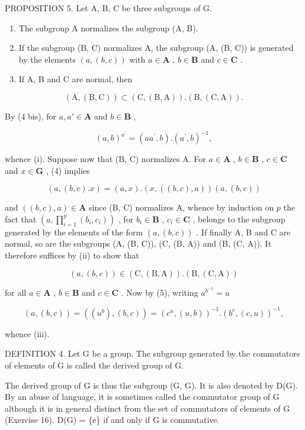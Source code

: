 PROPOSITION 5. Let A, B, C be three subgroups of G.

\begin{enumerate}
\def\labelenumi{(\roman{enumi})}
\item
  The subgroup A normalizes the subgroup (A, B).
\item
  If the subgroup (B, C) normalizes A, the subgroup (A, (B, C)) is generated by the elements \((a, (b, c))\) with \(a \in \mathbf{A}\) , \(b \in \mathbf{B}\) and \(c \in \mathbf{C}\) .
\item
  If A, B and C are normal, then
\end{enumerate}

\[
(\mathrm{A}, (\mathrm{B}, \mathrm{C})) \subset (\mathrm{C}, (\mathrm{B}, \mathrm{A})). (\mathrm{B}, (\mathrm{C}, \mathrm{A})).
\]

By (4 bis), for \(a, a' \in \mathbf{A}\) and \(b \in \mathbf{B}\) ,

\[
(a, b) ^ {a ^ {\prime}} = (a a ^ {\prime}, b). (a ^ {\prime}, b) ^ {- 1},
\]

whence (i). Suppose now that (B, C) normalizes A. For \(a \in \mathbf{A}\) , \(b \in \mathbf{B}\) , \(c \in \mathbf{C}\) and \(x \in \mathbf{G}\) , (4) implies

\[
(a, (b, c). x) = (a, x). (x, ((b, c), a)) (a, (b, c))
\]

and \(((b, c), a) \in \mathbf{A}\) since (B, C) normalizes A, whence by induction on \(p\) the fact that \(\left(a, \prod_{i=1}^{p} (b_i, c_i)\right)\) , for \(b_i \in \mathbf{B}\) , \(c_i \in \mathbf{C}\) , belongs to the subgroup generated by the elements of the form \((a, (b, c))\) . If finally A, B and C are normal, so are the subgroups (A, (B, C)), (C, (B, A)) and (B, (C, A)). It therefore suffices by (ii) to show that

\[
(a, (b, c)) \in (\mathrm{C}, (\mathrm{B}, \mathrm{A})). (\mathrm{B}, (\mathrm{C}, \mathrm{A}))
\]

for all \(a \in \mathbf{A}\) , \(b \in \mathbf{B}\) and \(c \in \mathbf{C}\) . Now by (5), writing \(a^{b^{-1}} = u\)

\[
(a, (b, c)) = ((u ^ {b}), (b, c)) = (c ^ {u}, (u, b)) ^ {- 1}. (b ^ {c}, (c, u)) ^ {- 1},
\]

whence (iii).

DEFINITION 4. Let G be a group. The subgroup generated by the commutators of elements of G is called the derived group of G.

The derived group of G is thus the subgroup (G, G). It is also denoted by D(G). By an abuse of language, it is sometimes called the commutator group of G although it is in general distinct from the set of commutators of elements of G (Exercise 16). D(G) = \{e\} if and only if G is commutative.

